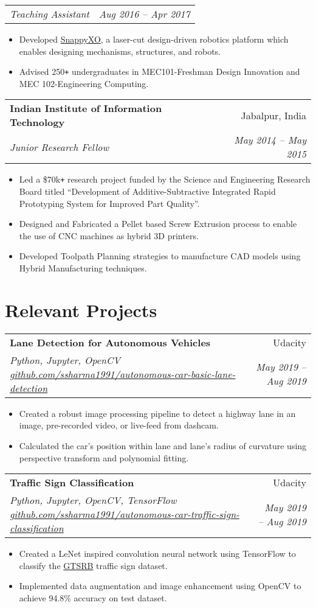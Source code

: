\documentclass[letterpaper,10pt]{article}
\makeatletter
\newcommand{\resumeHeading}[4]{
  \vspace{-1pt}
    \begin{tabular*}{0.97\textwidth}{l@{\extracolsep{\fill}}r}
      \textbf{#1} & #2 \vspace{-2pt}\\ \vspace{1pt}
      \textit{\small#3} & \textit{\small #4} \\
    \end{tabular*}
}
\newcommand{\resumeSubheadingWithDate}[2]{
    \begin{tabular*}{0.97\textwidth}{l@{\extracolsep{\fill}}r}
      \textit{\small#1} & \textit{\small #2}\\
    \end{tabular*}
    \vspace{+2pt}
}
\newcommand{\resumeSection}[1]{
\vspace{-12pt}
\section{\textbf{#1}}
}
\newcommand{\resumeItemListStart}{
\vspace{-7pt}
\begin{itemize}[leftmargin=14pt]
}
\newcommand{\resumeItemListEnd}{
\vspace{+7pt}
\end{itemize}
}
\newcommand{\resumeItem}[1]{
  \item\small{
      {#1 \vspace{-7pt}
      }
  }
}
\makeatother
\begin{document}
    \vspace{-5pt}
    \resumeSubheadingWithDate{Teaching Assistant}{Aug 2016 -- Apr 2017}
    \resumeItemListStart
    \resumeItem{Developed \href{http://snappyxo.com/}{SnappyXO}, a laser-cut design-driven robotics platform which enables designing mechanisms, structures, and robots.}
    \resumeItem{Advised 250\texttt{+} undergraduates in MEC101-Freshman Design Innovation and MEC 102-Engineering Computing.}
    \resumeItemListEnd
    
    \resumeHeading
    {Indian Institute of Information Technology}{Jabalpur, India}
    {Junior Research Fellow}{May 2014 -- May 2015}
    \resumeItemListStart
    \resumeItem{Led a \$70k\texttt{+} research project funded by the Science and Engineering Research Board titled “Development of Additive-Subtractive Integrated Rapid Prototyping System for Improved Part Quality”.}
    \resumeItem{Designed and Fabricated a Pellet based Screw Extrusion process to enable the use of CNC machines as hybrid 3D printers.}
    \resumeItem{Developed Toolpath Planning strategies to manufacture CAD models using Hybrid Manufacturing techniques.}
    \resumeItemListEnd



\resumeSection{Relevant Projects}
    
    \resumeHeading{Lane Detection for Autonomous Vehicles}{Udacity}{Python, Jupyter, OpenCV \href{https://github.com/ssharma1991/autonomous-car-basic-lane-detection}{github.com/ssharma1991/autonomous-car-basic-lane-detection}}{May 2019 -- Aug 2019}
    \resumeItemListStart
    \resumeItem{Created a robust image processing pipeline to detect a highway lane in an image, pre-recorded video, or live-feed from dashcam.}
    \resumeItem{Calculated the car's position within lane and lane's radius of curvature using perspective transform and polynomial fitting.}
    \resumeItemListEnd
    
    \vspace{-2pt}
    \resumeHeading{Traffic Sign Classification}{Udacity}{Python, Jupyter, OpenCV, TensorFlow \href{https://github.com/ssharma1991/autonomous-car-traffic-sign-classification}{github.com/ssharma1991/autonomous-car-traffic-sign-classification}}{May 2019 -- Aug 2019}
    \resumeItemListStart
    \resumeItem{Created a LeNet inspired convolution neural network using TensorFlow to classify the \href{http://benchmark.ini.rub.de/?section=gtsrb}{GTSRB} traffic sign dataset.}
    \resumeItem{Implemented data augmentation and image enhancement using OpenCV to achieve 94.8\% accuracy on test dataset.}
    \resumeItemListEnd
    
\end{document}
